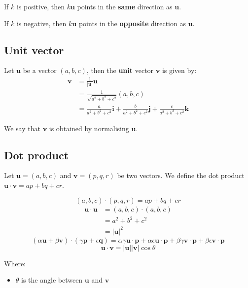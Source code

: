 \documentclass[11pt]{article}
\begin{document}
If \(k\) is positive, then \(k \boldsymbol{u}\) points in the \textbf{same} direction as \(\boldsymbol{u}\).

If \(k\) is negative, then \(k \boldsymbol{u}\) points in the \textbf{opposite} direction as \(\boldsymbol{u}\).

\subsection{Unit vector}
\label{sec:orgc8cfd56}
Let \(\boldsymbol{u}\) be a vector \((a, b, c)\), then the \textbf{unit} vector \(\boldsymbol{v}\) is given by:
\begin{align*}
\boldsymbol{v} &= \frac{1}{|\boldsymbol{u}|} \boldsymbol{u} \\
&= \frac{1}{\sqrt{a^2 + b^2 + c^2}} (a, b, c) \\
&= \frac{a}{a^2 + b^2 + c^2} \boldsymbol{i} + \frac{b}{a^2 + b^2 + c^2} \boldsymbol{j} + \frac{c}{a^2 + b^2 + c^2} \boldsymbol{k}
\end{align*}

We say that \(\boldsymbol{v}\) is obtained by normalising \(\boldsymbol{u}\).

\subsection{Dot product}
\label{sec:orgd904f8b}
Let \(\boldsymbol{u} = (a, b, c)\) and \(\boldsymbol{v} = (p, q, r)\) be two vectors. We define the dot product \(\boldsymbol{u} \cdot \boldsymbol{v} = ap + bq + cr\).

\[(a, b, c) \cdot (p, q, r) = ap + bq + cr\]
\begin{align*}
\boldsymbol{u} \cdot \boldsymbol{u} &= (a, b, c) \cdot (a, b, c) \\
&= a^2 + b^2 + c^2 \\
&= | \boldsymbol{u} |^2
\end{align*}
\[(\alpha \boldsymbol{u} + \beta \boldsymbol{v}) \cdot (\gamma \boldsymbol{p} + \epsilon \boldsymbol{q}) = \alpha \gamma \boldsymbol{u} \cdot \boldsymbol{p} + \alpha \epsilon \boldsymbol{u} \cdot \boldsymbol{p} + \beta \gamma \boldsymbol{v} \cdot \boldsymbol{p} + \beta \epsilon \boldsymbol{v} \cdot \boldsymbol{p}\]
\[\boldsymbol{u} \cdot \boldsymbol{v} = | \boldsymbol{u} | | \boldsymbol{v} | \cos \theta\]

Where:
\begin{itemize}
\item \(\theta\) is the angle between \(\boldsymbol{u}\) and \(\boldsymbol{v}\)
\end{itemize}
\end{document}
